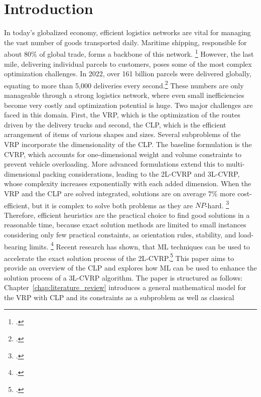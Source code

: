 \chapter{Introduction}
\label{sec:introduction}
In today’s globalized economy, efficient logistics networks are vital for managing the vast number of
goods transported daily. Maritime shipping, responsible for about $80\%$ of global trade,
forms a backbone of this network. \footcite[cf.][]{un_trade_and_development_unctad_review_2024}
However, the last mile, delivering individual parcels to customers, poses some of the most complex optimization
challenges. In 2022, over 161 billion parcels were delivered globally, equating to more than 5,000
deliveries every second.\footcite[cf.][]{statista_global_2022}
These numbers are only manageable through a strong logistics network, where even small inefficiencies
become very costly and optimization potential is huge. Two major challenges are faced in this domain.
First, the \gls{VRP}, which is the optimization of the routes driven by the delivery trucks and second,
the \gls{CLP}, which is the efficient arrangement of items of various shapes and sizes.
Several subproblems of the \gls{VRP} incorporate the dimensionality of the \gls{CLP}. The baseline formulation is the \gls{CVRP},
which accounts for one-dimensional weight and volume constraints to prevent vehicle overloading.
More advanced formulations extend this to multi-dimensional packing considerations,
leading to the \gls{2L-CVRP} and \gls{3L-CVRP}, whose complexity increases exponentially with each added dimension.
When the \gls{VRP} and the \gls{CLP} are solved integrated,
solutions are on average $7\%$ more cost-efficient, but it is complex to solve
both problems as they are $NP$-hard. \footcite[cf.][p. 23]{cote_value_2016} Therefore, efficient heuristics are the practical
choice to find good solutions in a reasonable time, because exact solution methods are limited to
small instances considering only few practical constaints, as orientation rules, stability, and load-bearing limits. \footcite[cf.][p. 377f]{bischoff_issues_1995}
Recent research has shown, that \gls{ML} techniques can be used to accelerate the exact solution process
of the \gls{2L-CVRP}.\footcite[cf.][]{zhang_learning-based_2022}
This paper aims to provide an overview of the \gls{CLP} and explores how \gls{ML} can be used
to enhance the solution process of a \gls{3L-CVRP} algorithm.
The paper is structured as follows:
Chapter~\ref{chap:literature_review} introduces a general mathematical model for
the \gls{VRP} with CLP and its constraints as a subproblem as well as classical
